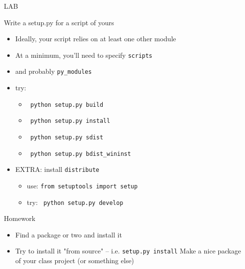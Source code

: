 \documentclass{beamer}
\begin{document}
\begin{frame}[fragile]{LAB}

{\Large Write a setup.py for a script of yours}

\begin{itemize}
  \item Ideally, your script relies on at least one other module
  \item At a minimum, you'll need to specify \verb|scripts|
  \item and probably \verb|py_modules|
  \item try:
  \begin{itemize}
    \item \verb| python setup.py build| 
    \item \verb| python setup.py install| 
    \item \verb| python setup.py sdist| 
    \item \verb| python setup.py bdist_wininst| 
  \end{itemize}
  \item EXTRA: install \verb|distribute|
  \begin{itemize}
    \item use: \verb|from setuptools import setup|
    \item try: \verb| python setup.py develop| 
  \end{itemize}
\end{itemize}

\end{frame}

%
%
%


\begin{frame}{Homework}

\begin{itemize}
  \item Find a package or two and install it
  \item Try to install it "from source" -- i.e. \verb|setup.py install| 
  \itme Make a nice package of your class project (or something else)
\end{itemize}

\end{frame}
\end{document}
